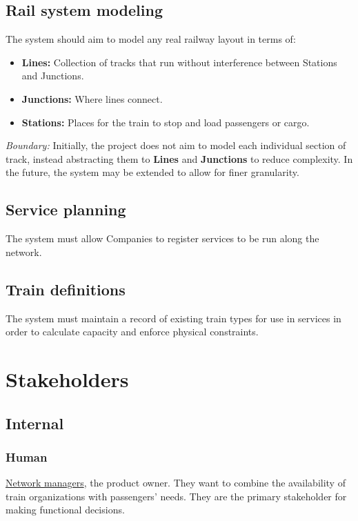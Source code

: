 \documentclass[12pt]{article}
\renewcommand\bf[1]{\textbf{#1}}
\renewcommand\it[1]{\textit{#1}}
\newcommand\un[1]{\underline{#1}}
\begin{document}
\subsection{Rail system modeling} \label{O.6}
The system should aim to model any real railway layout in terms of:
\begin{itemize}
	\item \bf{Lines:} Collection of tracks that run without interference between Stations and Junctions.
	\item \bf{Junctions:} Where lines connect.
	\item \bf{Stations:} Places for the train to stop and load passengers or cargo.
\end{itemize}
\it{Boundary:} Initially, the project does not aim to model each individual section of track, instead abstracting them to \bf{Lines} and \bf{Junctions} to reduce complexity.
In the future, the system may be extended to allow for finer granularity.

\subsection{Service planning} \label{O.7}
The system must allow Companies to register services to be run along the network.

\subsection{Train definitions} \label{O.8}
The system must maintain a record of existing train types for use in services in order to calculate capacity and enforce physical constraints.

\section*{Stakeholders}
\subsection*{Internal}

\subsubsection*{Human}
\un{Network managers}, the product owner. They want to combine the availability of train organizations with passengers' needs.
They are the primary stakeholder for making functional decisions.
\end{document}
